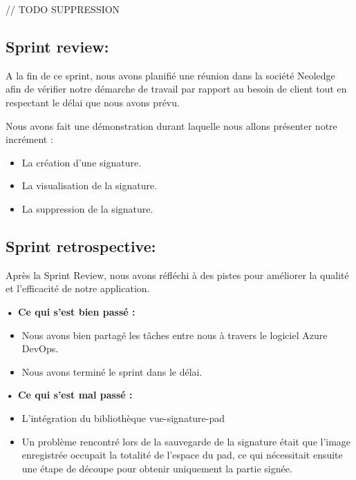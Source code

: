 // TODO SUPPRESSION


\subsection{Sprint review:}
A la fin de ce sprint, nous avons planifié une réunion dans la société Neoledge afin de vérifier notre démarche de travail par rapport au besoin de client tout en respectant le délai que nous avons prévu.

Nous avons fait une démonstration durant laquelle nous allons présenter notre incrément :

\begin{itemize}
  \item La création d'une signature.
  \item La visualisation de la signature.
  \item La suppression de la signature.
\end{itemize}

\subsection{Sprint retrospective:}

Après la Sprint Review, nous avons réfléchi à des pistes pour améliorer la qualité et l'efficacité de notre application.

\noindent\textbf{•	Ce qui s'est bien passé :}
\begin{itemize}
  \item Nous avons bien partagé les tâches entre nous à travers le logiciel Azure DevOps. 
  \item Nous avons terminé le sprint dans le délai.
\end{itemize}

\noindent\textbf{•	Ce qui s'est mal passé :}
\begin{itemize}
  \item L'intégration du bibliothèque vue-signature-pad
  \item Un problème rencontré lors de la sauvegarde de la signature était que l'image enregistrée occupait la totalité de l'espace du pad, ce qui nécessitait ensuite une étape de découpe pour obtenir uniquement la partie signée.
\end{itemize}
